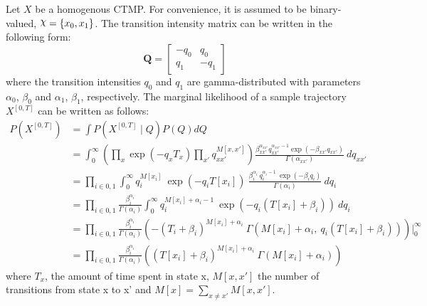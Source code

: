 Let $ X $ be a homogenous CTMP. For convenience, it is assumed to be binary-valued, $ \rchi = \left\lbrace x_{0}, x_{1} \right\rbrace $. The transition intensity matrix can be written in the following form:
\begin{equation}
\textbf{Q} = 
\begin{bmatrix}
-q_{0} & q_{0} \\
q_{1} & -q_{1}
\end{bmatrix}
\end{equation}
where the transition intensities $ q_{0} $ and $ q_{1} $ are gamma-distributed with parameters $ \alpha_{0}$, $ \beta_{0} $ and $ \alpha_{1} $, $ \beta_{1} $, respectively. The marginal likelihood of a sample trajectory $ X^{[0,T]} $ can be written as follows:
\begin{align}
P(X^{[0, T]}) & = \int  P(X^{[0, T]}\mid Q)P(Q) dQ \nonumber\\ 
& = \int_{0}^{\infty} \left( \prod_{x} \exp(-q_{x}T_{x}) \prod_{x'} q_{xx'}^{M[x, x']}\right) \frac{\beta_{xx'}^{\alpha_{xx'}}{q_{xx'}^{\alpha_{xx'}-1}}\exp(-\beta_{xx'}q_{xx'})}{\Gamma(\alpha_{xx'})} \ dq_{xx'} \nonumber\\ 
& = \prod_{i\in{0,1}}\int_{0}^{\infty} q_{i}^{M[x_{i}]} \ \exp(-q_{i}T[x_{i}]) \  \frac{\beta_{i}^{\alpha_{i}} \ q_{i}^{\alpha_{i}-1}\ \exp(-\beta_{i}q_{i})}{\Gamma(\alpha_{i})} \ dq_{i} \nonumber\\ 
& = \prod_{i\in{0,1}} \frac{\beta_{i}^{\alpha_{i}}}{\Gamma(\alpha_{i})} \int_{0}^{\infty} q_{i}^{M[x_{i}] + \alpha_{i} -1} \ \exp(-q_{i}(T[x_{i}]+\beta_{i})) \ dq_{i} \nonumber\\ 
& = \prod_{i\in{0,1}} \frac{\beta_{i}^{\alpha_{i}}}{\Gamma(\alpha_{i})} \left( -(T_{i}+\beta_{i})^{M[x_{i}] + \alpha_{i}}\ \Gamma(M[x_{i}] + \alpha_{i}, \ q_{i}(T[x_{i}]+\beta_{i})) \right) \Big|_0^\infty  \nonumber\\ 
& = \prod_{i\in{0,1}} \frac{\beta_{i}^{\alpha_{i}}}{\Gamma(\alpha_{i})} \left( (T[x_{i}]+\beta_{i})^{M[x_{i}] + \alpha_{i}}\ \Gamma(M[x_{i}] + \alpha_{i}) \right)
\label{eq:Marg_traj}
\end{align}
where $ T_{x} $, the amount of time spent in state x, $ M[x,x'] $ the number of transitions from state x to x' and  $ M[x] = \sum_{x\neq x'}M[x,x'] $.\\


